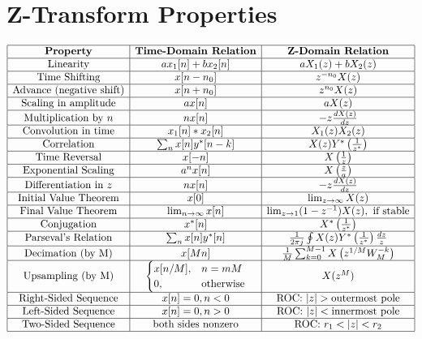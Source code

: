 \documentclass{AnantDocumentation}
\begin{document}
\section{Z-Transform Properties}
\[
\begin{array}{|c|c|c|}
\hline
\textbf{Property} & \textbf{Time-Domain Relation} & \textbf{Z-Domain Relation} \\
\hline
\text{Linearity} & a x_1[n] + b x_2[n] & a X_1(z) + b X_2(z) \\
\hline
\text{Time Shifting} & x[n - n_0] & z^{-n_0} X(z) \\
\hline
\text{Advance (negative shift)} & x[n + n_0] & z^{n_0} X(z) \\
\hline
\text{Scaling in amplitude} & a x[n] & a X(z) \\
\hline
\text{Multiplication by } n & n x[n] & -z \frac{dX(z)}{dz} \\
\hline
\text{Convolution in time} & x_1[n] * x_2[n] & X_1(z) X_2(z) \\
\hline
\text{Correlation} & \sum_n x[n] y^*[n-k] & X(z) Y^*\left(\frac{1}{z^*}\right) \\
\hline
\text{Time Reversal} & x[-n] & X\left(\frac{1}{z}\right) \\
\hline
\text{Exponential Scaling} & a^n x[n] & X\left(\frac{z}{a}\right) \\
\hline
\text{Differentiation in } z & n x[n] & -z \frac{dX(z)}{dz} \\
\hline
\text{Initial Value Theorem} & x[0] & \lim_{z \to \infty} X(z) \\
\hline
\text{Final Value Theorem} & \lim_{n \to \infty} x[n] & \lim_{z \to 1} (1 - z^{-1}) X(z), \text{ if stable} \\
\hline
\text{Conjugation} & x^*[n] & X^*\left(\frac{1}{z^*}\right) \\
\hline
\text{Parseval’s Relation} & \sum_n x[n] y^*[n] & \frac{1}{2\pi j} \oint X(z) Y^*\left(\frac{1}{z^*}\right) \frac{dz}{z} \\
\hline
\text{Decimation (by M)} & x[Mn] & \frac{1}{M} \sum_{k=0}^{M-1} X\left(z^{1/M} W_M^{-k}\right) \\
\hline
\text{Upsampling (by M)} & 
\begin{cases}
x[n/M], & n = mM \\
0, & \text{otherwise}
\end{cases}
& X(z^M) \\
\hline
\text{Right-Sided Sequence} & x[n] = 0, n < 0 & \text{ROC: } |z| > \text{outermost pole} \\
\hline
\text{Left-Sided Sequence} & x[n] = 0, n > 0 & \text{ROC: } |z| < \text{innermost pole} \\
\hline
\text{Two-Sided Sequence} & \text{both sides nonzero} & \text{ROC: } r_1 < |z| < r_2 \\
\hline
\end{array}
\]
\end{document}
